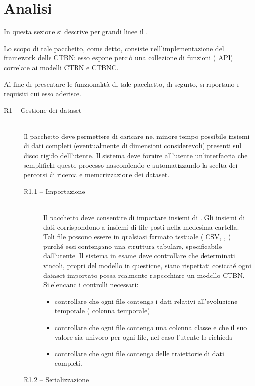 \section{Analisi}\label{sec:rctbn-describ}
In questa sezione si descrive per grandi linee il \pacchettor{}.

Lo scopo di tale pacchetto, come detto, consiste nell'implementazione del framework delle \acs{CTBN}: esso espone perciò una collezione di funzioni (\ie{} \acs{API}) correlate ai modelli \acs{CTBN} e \acs{CTBNC}.

Al fine di presentare le funzionalità di tale pacchetto, di seguito, si riportano i requisiti cui esso aderisce.
\begin{description}
	\item[R1 -- Gestione dei dataset] \hfill \\
	Il pacchetto deve permettere di caricare nel minore tempo possibile insiemi di dati completi (eventualmente di dimensioni considerevoli) presenti sul disco rigido dell'utente. Il sistema deve fornire all'utente un'interfaccia che semplifichi questo processo nascondendo e automatizzando la scelta dei percorsi di ricerca e memorizzazione dei dataset.
		\begin{description}
		\item[R1.1 -- Importazione] \hfill \\
		Il pacchetto deve consentire di importare insiemi di \emph{}. Gli insiemi di dati corrispondono a insiemi di file posti nella medesima cartella. Tali file possono essere in qualsiasi formato testuale (\eg{} \acs{CSV}, , ) purché essi contengano una struttura tabulare, specificabile dall'utente. Il sistema in esame deve controllare che determinati vincoli, propri del modello in questione, siano rispettati cosicché ogni dataset importato possa realmente rispecchiare un modello \acs{CTBN}. Si elencano i controlli necessari:
		\begin{itemize}
			\item controllare che ogni file contenga i dati relativi all'evoluzione temporale (\ie{} colonna temporale)
			\item controllare che ogni file contenga una colonna classe e che il suo valore sia univoco per ogni file, nel caso l'utente lo richieda
			\item controllare che ogni file contenga delle traiettorie di dati completi.
		\end{itemize}
		\item[R1.2 -- Serializzazione] \hfill \\

\end{description}
\end{description}
